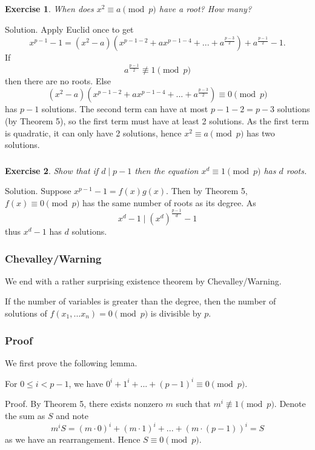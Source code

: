 \documentclass{article}
\newtheorem{exercise}{Exercise}
\begin{document}
\subsubsection{}
\begin{exercise}
    When does $x^{2} \equiv a \pmod{p}$ have a root? How many?
\end{exercise}
Solution. Apply Euclid once to get
\begin{equation}
    x^{p-1}-1 = (x^{2}-a)(x^{p-1-2} + ax^{p-1-4} + ... + a^{\frac{p-3}{2}}) + a^{\frac{p-1}{2}} - 1.
\end{equation}
If
$$a^{\frac{p-1}{2}} \not \equiv 1 \pmod{p}$$
then there are no roots. Else
\begin{equation}
    (x^{2}-a)(x^{p-1-2} + ax^{p-1-4} + ... + a^{\frac{p-3}{2}}) \equiv 0 \pmod{p}
\end{equation}
has $p-1$ solutions. The second term can have at most $p-1-2 = p-3$ solutions (by Theorem 5), so the first term must have at least 2 solutions. As the first term is quadratic, it can only have 2 solutions, hence $x^{2} \equiv a \pmod{p}$ has two solutions.

\subsubsection{}
\begin{exercise}
    Show that if $d \mid p-1$ then the equation $x^{d} \equiv 1 \pmod{p}$ has $d$ roots.
\end{exercise}
Solution. Suppose $x^{p-1} - 1 = f(x)g(x)$. Then by Theorem 5, $f(x) \equiv 0 \pmod{p}$ has the same number of roots as its degree. As
$$x^{d} - 1 \mid (x^{d})^{\frac{p-1}{d}}-1 $$
thus $x^{d} - 1$ has $d$ solutions.

\subsubsection{Chevalley/Warning}
We end with a rather surprising existence theorem by Chevalley/Warning.
\begin{thm}
    If the number of variables is greater than the degree, then the number of solutions of $f(x_{1},...x_{n}) = 0 \pmod{p}$ is divisible by $p$.
\end{thm}

\subsubsection{Proof}
We first prove the following lemma.
\begin{lemma}
    For $0 \leq i < p-1$, we have $0^{i} + 1^{i} + ... + (p-1)^{i} \equiv 0 \pmod{p}.$
\end{lemma}
Proof. By Theorem 5, there exists nonzero $m$ such that $m^{i} \not\equiv 1 \pmod{p}$. Denote the sum as $S$ and note
\begin{equation}
    m^{i}S = (m\cdot0)^{i} + (m\cdot1)^{i} + ... + (m\cdot(p-1))^{i} = S
\end{equation}
as we have an rearrangement. Hence $S \equiv 0 \pmod{p}$.
\end{document}
